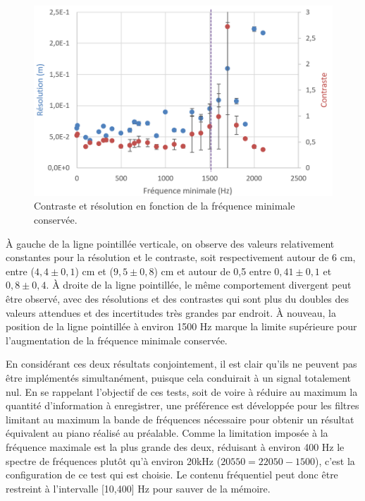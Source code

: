 ﻿\documentclass[11pt,letterpaper]{article}
\begin{document}
\begin{figure}[H]
    \centering
    \includegraphics[scale=0.55]{Freqmin_graph.png}
    \caption{Contraste et résolution en fonction de la fréquence minimale conservée.}
    \label{fmin_fig}
\end{figure}

À gauche de la ligne pointillée verticale, on observe des valeurs relativement 
constantes pour la résolution et le contraste, soit respectivement autour de 6 cm,
entre ($4,4 \pm 0,1$) cm et ($9,5 \pm 0,8$) cm et autour de 0,5 entre 
$0,41 \pm 0,1$ et $0,8 \pm 0,4$. À droite de la ligne pointillée, le même 
comportement divergent peut être observé, avec des résolutions et des contrastes 
qui sont plus du doubles des valeurs attendues et des incertitudes très grandes par 
endroit. À nouveau, la position de la ligne pointillée à environ 1500 Hz marque la 
limite supérieure pour l'augmentation de la fréquence minimale conservée.

En considérant ces deux résultats conjointement, il est clair qu'ils ne peuvent pas 
être implémentés simultanément, puisque cela conduirait à un signal totalement nul. 
En se rappelant l'objectif de ces tests, soit de voire à réduire au maximum la 
quantité d'information à enregistrer, une préférence est développée pour les filtres
limitant au maximum la bande de fréquences nécessaire pour obtenir un 
résultat équivalent au piano réalisé au préalable. Comme la limitation imposée à la
fréquence maximale est la plus grande des deux, réduisant à environ 400 Hz le 
spectre de fréquences plutôt qu'à environ 20kHz ($20 550=22 050 - 1500$), c'est la 
configuration de ce test qui est choisie. 
Le contenu fréquentiel peut donc être restreint à l'intervalle [10,400] Hz pour sauver de la
mémoire.
\end{document}
